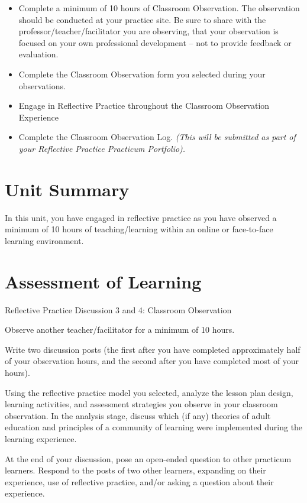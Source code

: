 \documentclass[
]{book}
\providecommand{\tightlist}{%
  \setlength{\itemsep}{0pt}\setlength{\parskip}{0pt}}
\begin{document}
\begin{reflect}
\begin{itemize}
\tightlist
\item
  Complete a minimum of 10 hours of Classroom Observation. The observation should be conducted at your practice site. Be sure to share with the professor/teacher/facilitator you are observing, that your observation is focused on your own professional development -- not to provide feedback or evaluation.\\
\item
  Complete the Classroom Observation form you selected during your observations.\\
\item
  Engage in Reflective Practice throughout the Classroom Observation Experience\\
\item
  Complete the Classroom Observation Log. \emph{(This will be submitted as part of your Reflective Practice Practicum Portfolio).}
\end{itemize}
\end{reflect}

\hypertarget{unit-summary-1}{%
\section*{Unit Summary}\label{unit-summary-1}}

In this unit, you have engaged in reflective practice as you have observed a minimum of 10 hours of teaching/learning within an online or face-to-face learning environment.

\hypertarget{assessment-of-learning}{%
\section{Assessment of Learning}\label{assessment-of-learning}}

\begin{assessment}
{Reflective Practice Discussion 3 and 4: Classroom Observation}

Observe another teacher/facilitator for a minimum of 10 hours.

Write two discussion posts (the first after you have completed approximately half of your observation hours, and the second after you have completed most of your hours).

Using the reflective practice model you selected, analyze the lesson plan design, learning activities, and assessment strategies you observe in your classroom observation. In the analysis stage, discuss which (if any) theories of adult education and principles of a community of learning were implemented during the learning experience.

At the end of your discussion, pose an open-ended question to other practicum learners. Respond to the posts of two other learners, expanding on their experience, use of reflective practice, and/or asking a question about their experience.
\end{assessment}
\end{document}
